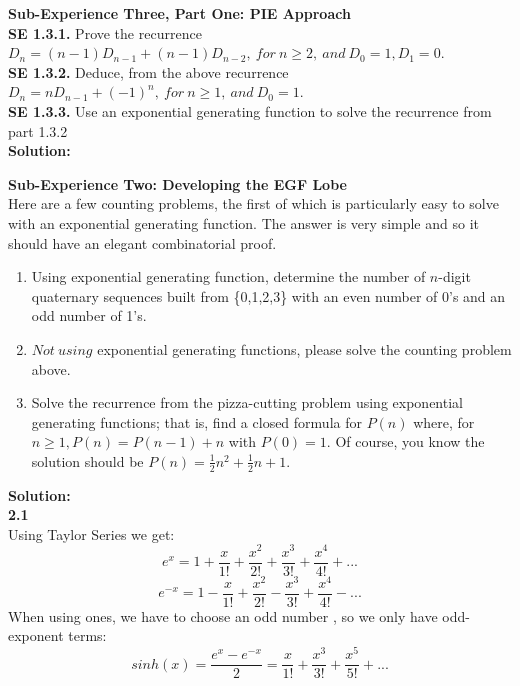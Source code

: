 \documentclass[10pt,a4paper]{report}
\begin{document}
	\textbf{Sub-Experience Three, Part One: PIE Approach}\\
	\newline
	\textbf{SE 1.3.1.} Prove the recurrence $D_n = (n-1)D_{n-1} + (n-1)D_{n-2},\ for\ n\geq 2,\ and\ D_0 = 1, D_1=0$.\\
	\textbf{SE 1.3.2.} Deduce, from the above recurrence $D_n = nD_{n-1}+(-1)^n,\ for\ n\geq 1,\ and\ D_0 = 1$.\\
	\textbf{SE 1.3.3.} Use an exponential generating function to solve the recurrence from part 1.3.2\\
	\newline
	\textbf{Solution: }\\
	\newline
	

	\textbf{Sub-Experience Two: Developing the EGF Lobe}\\
	Here are a few counting problems, the first of which is particularly easy to solve with an exponential generating function.  The answer is very simple and so it should have an elegant combinatorial proof.
	\begin{enumerate}
		\item Using exponential generating function, determine the number of $n$-digit quaternary sequences built from \{0,1,2,3\} with an even number of 0's and an odd number of 1's.
		\item $Not\ using$ exponential generating functions, please solve the counting problem above.
		\item Solve the recurrence from the pizza-cutting problem using exponential generating functions; that is, find a closed formula for $P(n)$ where, for $n\geq1, P(n) = P(n-1) + n$ with $P(0) = 1$.  Of course, you know the solution should be $P(n) = \frac{1}{2}n^2 + \frac{1}{2}n + 1$.
	\end{enumerate}
	\textbf{Solution: }\\
	\newline
	\textbf{2.1}\\
	Using Taylor Series we get:\\
	\[e^x = 1 + \frac{x}{1!} + \frac{x^2}{2!} + \frac{x^3}{3!} + \frac{x^4}{4!} + ...\]
	\[e^{-x} = 1 - \frac{x}{1!} + \frac{x^2}{2!} - \frac{x^3}{3!} + \frac{x^4}{4!} - ...\]
	When using ones, we have to choose an odd number , so we only have odd-exponent terms:\\
	\[sinh(x) = \frac{e^x - e^{-x}}{2} = \frac{x}{1!} + \frac{x^3}{3!} + \frac{x^5}{5!} + ...\]
\end{document}
